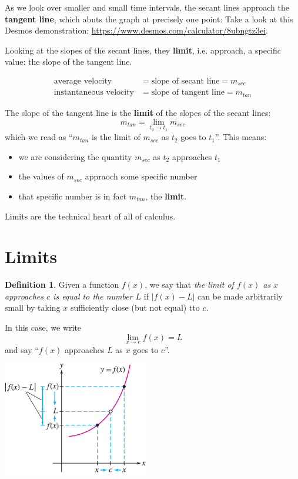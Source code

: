 \documentclass[11pt,reqno,final]{amsart}
\numberwithin{equation}{section}
\numberwithin{figure}{section}
\theoremstyle{definition} %
\newtheorem*{definition*}{Definition}%
\begin{document}
As we look over smaller and small time intervals, the secant lines approach the \textbf{tangent line}, which abuts the graph at precisely one point:
Take a look at this Desmos demonstration: \url{https://www.desmos.com/calculator/8ubngtz3ei}.

Looking at the slopes of the secant lines, they \textbf{limit}, i.e. approach, a specific value: the slope of the tangent line.
\begin{framed}
        \begin{align*}
          \text{average velocity} &= \text{slope of secant line} = m_{sec}\\
          \text{instantaneous velocity} &= \text{slope of tangent line} = m_{tan}
        \end{align*}
\end{framed}

The slope of the tangent line is the \textbf{limit} of the slopes of the secant lines:
\[
        m_{tan} = \lim_{t_2 \to t_1} m_{sec}
\]
which we read as ``$m_{tan}$ is the limit of $m_{sec}$ as $t_2$ goes to $t_1$''.
This means:
\begin{itemize}
\item we are considering the quantity $m_{sec}$ as $t_2$ approaches $t_1$
\item the values of $m_{sec}$ appraoch some specific number
\item that specific number is in fact $m_{tan}$, the \textbf{limit}.
\end{itemize}

Limits are the technical heart of all of calculus.


\newpage

\section{Limits}

\begin{definition*}
        Given a function $f(x)$, we say that \textit{the limit of $f(x)$ as $x$ approaches $c$ is equal to the number $L$} if
        $|f(x)-L|$ can be made arbitrarily small by taking $x$ sufficiently close (but not equal) tto $c$.

        In this case, we write
        \[
                \lim_{x \to c}f(x) = L
        \]
        and say ``$f(x)$ approaches $L$ as $x$ goes to $c$''.
        \begin{center}
                \includegraphics[width=2.5in]{09-16P-lim.png}
        \end{center}
\end{definition*}
\end{document}
